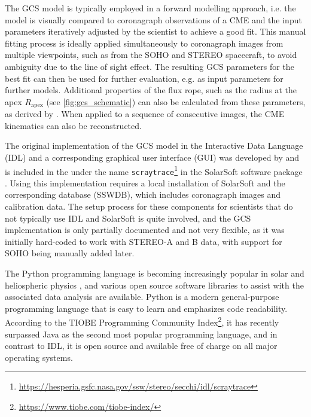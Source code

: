 The GCS model is typically employed in a forward modelling approach, i.e. the model is visually compared to coronagraph observations of a CME and the input parameters iteratively adjusted by the scientist to achieve a good fit. This manual fitting process is ideally applied simultaneously to coronagraph images from multiple viewpoints, such as from the SOHO and STEREO spacecraft, to avoid ambiguity due to the line of sight effect. The resulting GCS parameters for the best fit can then be used for further evaluation, e.g. as input parameters for further models. Additional properties of the flux rope, such as the radius at the apex $R_\text{apex}$ (see \autoref{fig:gcs_schematic}) can also be calculated from these parameters, as derived by \citep{Thernisien-2011-GCS}. When applied to a sequence of consecutive images, the CME kinematics can also be reconstructed.

The original implementation of the GCS model in the Interactive Data Language (IDL) and a corresponding graphical user interface (GUI) was developed by \citet{Thernisien-2006-GCS} and is included in the under the name \texttt{scraytrace}\footnote{\url{https://hesperia.gsfc.nasa.gov/ssw/stereo/secchi/idl/scraytrace}} in the SolarSoft software package \citep{Freeland-1998-SolarSoft}. Using this implementation requires a local installation of SolarSoft and the corresponding database (SSWDB), which includes coronagraph images and calibration data. The setup process for these components for scientists that do not typically use IDL and SolarSoft is quite involved, and the GCS implementation is only partially documented and not very flexible, as it was initially hard-coded to work with STEREO-A and B data, with support for SOHO being manually added later.

The Python programming language is becoming increasingly popular in solar and heliospheric physics \citep[e.g.]{Burrell-2018}, and various open source software libraries to assist with the associated data analysis are available. Python is a modern general-purpose programming language that is easy to learn and emphasizes code readability. According to the TIOBE Programming Community Index\footnote{\url{https://www.tiobe.com/tiobe-index/}}, it has recently surpassed Java as the second most popular programming language, and in contrast to IDL, it is open source and available free of charge on all major operating systems.

